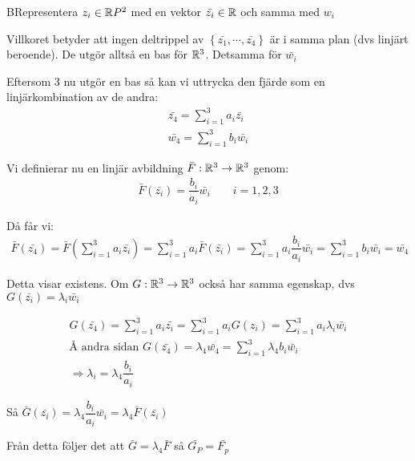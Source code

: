 \begin{prf}
  BRepresentera $z_i\in\mathbb{R} P^2$ med en vektor $\bar{z_i}\in\mathbb{R}$ och samma med $w_i$
  \par\bigskip
  \noindent Villkoret betyder att ingen deltrippel av $\left\{\bar{z_1},\cdots,\bar{z_4}\right\}$ är i samma plan (dvs linjärt beroende). De utgör alltså en bas för $\mathbb{R}^3$. Detsamma för $\bar{w_i}$
  \par\bigskip
  \noindent Eftersom 3 nu utgör en bas så kan vi uttrycka den fjärde som en linjärkombination av de andra:
  \begin{equation*}
    \begin{gathered}
      \bar{z_4} = \sum_{i=1}^{3}a_i\bar{z_i}\\
      \bar{w_4} = \sum_{i=1}^{3}b_i\bar{w_i}
    \end{gathered}
  \end{equation*}
  \par\bigskip
  \noindent Vi definierar nu en linjär avbildning $\bar{F}:\mathbb{R}^3\to\mathbb{R}^3$ genom:
  \begin{equation*}
    \begin{gathered}
      \bar{F}(\bar{z_i}) = \dfrac{b_i}{a_i}\bar{w_i}\qquad i=1,2,3
    \end{gathered}
  \end{equation*}
  \par\bigskip
  \noindent Då får vi:
  \begin{equation*}
    \begin{gathered}
      \bar{F}(\bar{z_4}) = \bar{F}\left(\sum_{i=1}^{3}a_i\bar{z_i}\right) = \sum_{i=1}^{3}a_i\bar{F}(\bar{z_i}) = \sum_{i=1}^{3}a_i\dfrac{b_i}{a_i}\bar{w_i} = \sum_{i=1}^{3}b_i\bar{w_i} = \bar{w_4}
    \end{gathered}
  \end{equation*}
  \par\bigskip
  \noindent Detta visar existens. Om $G:\mathbb{R}^3\to\mathbb{R}^3$ också har samma egenskap, dvs $G(\bar{z_i})=\lambda_i\bar{w_i}$\par
  \begin{equation*}
    \begin{gathered}
      G(\bar{z_4}) = \sum_{i=1}^{3}a_i\bar{z_i} = \sum_{i=1}^{3}a_iG(z_i) = \sum_{i=1}^{3}a_i\lambda_i\bar{w_i}\\
      \text{Å andra sidan } G(\bar{z_4}) = \lambda_4\bar{w_4} = \sum_{i=1}^{3}\lambda_4b_i\bar{w_i}\\
      \Rightarrow \lambda_i = \lambda_4\dfrac{b_i}{a_i}
    \end{gathered}
  \end{equation*}
  \par\bigskip
  \noindent Så $\bar{G}(\bar{z_i}) = \lambda_4\dfrac{b_i}{a_i}\bar{w_i} = \lambda_4\bar{F}(\bar{z_i})$\par
  \noindent Från detta följer det att $\bar{G} = \lambda_4\bar{F}$ så $\bar{G_P} = \bar{F_p}$
\end{prf}
\par\bigskip
